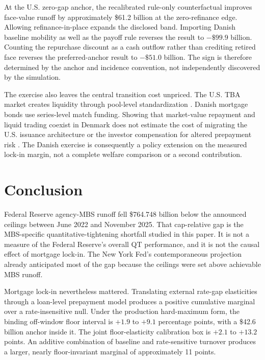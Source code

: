At the U.S. zero-gap anchor, the recalibrated rule-only counterfactual improves face-value runoff by approximately \$61.2 billion at the zero-refinance edge. Allowing refinance-in-place expands the disclosed band. Importing Danish baseline mobility as well as the payoff rule reverses the result to $-\$99.9$ billion. Counting the repurchase discount as a cash outflow rather than crediting retired face reverses the preferred-anchor result to $-\$51.0$ billion. The sign is therefore determined by the anchor and incidence convention, not independently discovered by the simulation.

The exercise also leaves the central transition cost unpriced. The U.S. TBA market creates liquidity through pool-level standardization \citep{vickery2013,gao2017,song2019,fuster2023}. Danish mortgage bonds use series-level match funding. Showing that market-value repayment and liquid trading coexist in Denmark does not estimate the cost of migrating the U.S. issuance architecture or the investor compensation for altered prepayment risk \citep{diep2021}. The Danish exercise is consequently a policy extension on the measured lock-in margin, not a complete welfare comparison or a second contribution.

\section{Conclusion}\label{sec:conclusion}\label{sec:limitations}

Federal Reserve agency-MBS runoff fell \$764.748 billion below the announced ceilings between June 2022 and November 2025. That cap-relative gap is the MBS-specific quantitative-tightening shortfall studied in this paper. It is not a measure of the Federal Reserve's overall QT performance, and it is not the causal effect of mortgage lock-in. The New York Fed's contemporaneous projection already anticipated most of the gap because the ceilings were set above achievable MBS runoff.

Mortgage lock-in nevertheless mattered. Translating external rate-gap elasticities through a loan-level prepayment model produces a positive cumulative marginal over a rate-insensitive null. Under the production hard-maximum form, the binding off-window floor interval is $+1.9$ to $+9.1$ percentage points, with a \$42.6 billion anchor inside it. The joint floor-elasticity calibration box is $+2.1$ to $+13.2$ points. An additive combination of baseline and rate-sensitive turnover produces a larger, nearly floor-invariant marginal of approximately 11 points.

